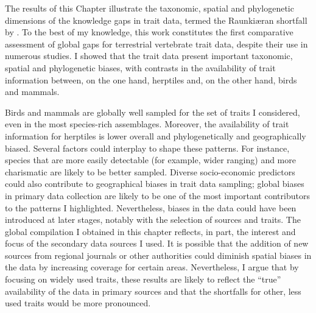The results of this Chapter illustrate the taxonomic, spatial and phylogenetic dimensions of the knowledge gaps in trait data, termed the Raunkiæran shortfall by \citet{Hortal2015}. To the best of my knowledge, this work constitutes the first comparative assessment of global gaps for terrestrial vertebrate trait data, despite their use in numerous studies. I showed that the trait data present important taxonomic, spatial and phylogenetic biases, with contrasts in the availability of trait information between, on the one hand, herptiles and, on the other hand, birds and mammals.

Birds and mammals are globally well sampled for the set of traits I considered, even in the most species-rich assemblages. Moreover, the availability of trait information for herptiles is lower overall and phylogenetically and geographically biased. Several factors could interplay to shape these patterns. For instance, species that are more easily detectable (for example, wider ranging) and more charismatic are likely to be better sampled. Diverse socio-economic predictors could also contribute to geographical biases in trait data sampling; global biases in primary data collection are likely to be one of the most important contributors to the patterns I highlighted. Nevertheless, biases in the data could have been introduced at later stages, notably with the selection of sources and traits. The global compilation I obtained in this chapter reflects, in part, the interest and focus of the secondary data sources I used. It is possible that the addition of new sources from regional journals or other authorities could diminish spatial biases in the data by increasing coverage for certain areas. Nevertheless, I argue that by focusing on widely used traits, these results are likely to reflect the “true” availability of the data in primary sources and that the shortfalls for other, less used traits would be more pronounced.


